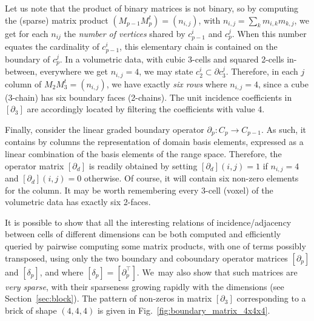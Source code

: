 Let us note that the product of binary matrices is not binary, so by computing the (sparse) matrix product $(M_{p-1} M_{p}^t) = (n_{i,j})$, with $n_{i,j} = \sum_{k} m_{i,k}m_{k,j}$, we get for each $n_{ij}$ the \emph{number of vertices} shared by $c_{p-1}^i$ and $c_{p}^j$. When this number equates the cardinality of $c_{p-1}^i$, this elementary chain is contained on the boundary of $c_{p}^j$. In a volumetric data, with cubic 3-cells and squared 2-cells in-between, everywhere we get $n_{i,j}=4$, we may state $c_{2}^i\subset\partial c_{3}^j$. Therefore, in each $j$ column of $M_{2} M_{3}^t = (n_{i,j})$, we have exactly \emph{six rows} where  $n_{i,j} = 4$, since a cube (3-chain) has six boundary faces (2-chains). The unit incidence coefficients in $\left[\partial_3\right]$ are accordingly located by filtering the coefficients with value 4.

Finally, consider the linear graded boundary operator $\partial_p : C_p \to C_{p-1}$. As such, it contains by columns the representation of domain basis elements, expressed as a linear combination of the basis elements of the range space. Therefore, the operator matrix $[\partial_d]$ is readily obtained by setting $[\partial_d](i,j)=1$ if $n_{i,j}=4$ and $[\partial_d](i,j)=0$ otherwise.  Of course, it will contain six non-zero elements for the column.  It may be worth remembering every 3-cell (voxel) of the volumetric data has exactly six 2-faces. 

It is possible to show that all the interesting relations of incidence/adjacency between cells of different dimensions can be both computed and efficiently queried by pairwise computing some matrix products, with one of terms possibly transposed, using only the two boundary and coboundary operator matrices $[\partial_p]$ and $[\delta_p]$, and where $[\delta_p] = [\partial_p^\top]$. We~may also show that such matrices are \emph{very sparse}, with their sparseness growing rapidly with the dimensions (see Section~\ref{sec:block}). The pattern of non-zeros in matrix $[\partial_3]$ corresponding to a brick of shape $(4,4,4)$ is given in Fig.~\ref{fig:boundary_matrix_4x4x4}.

